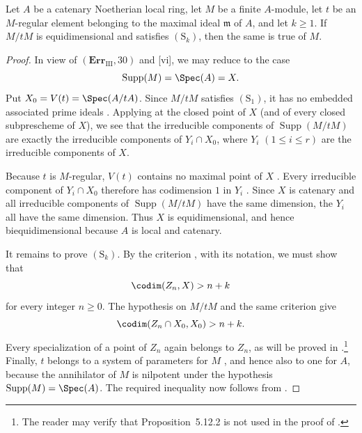 \begin{proposition}[5.12.2]
\label{IV.5.12.2}
Let $A$ be a catenary Noetherian local ring, let $M$ be a finite
$A$-module, let $t$ be an $M$-regular element belonging to the
maximal ideal $\mathfrak m$ of $A$, and let $k\geq1$.  If $M/tM$
is equidimensional and satisfies $(\mathrm S_k)$, then the same is
true of $M$.
\end{proposition}

\begin{proof}
In view of $(\mathbf{Err}_{\mathrm{III}},30)$ and
[vi], we may reduce to the case
\[
  \operatorname{Supp}(M)=\Spec(A)=X.
\]
Put $X_0=V(t)=\Spec(A/tA)$.  Since $M/tM$ satisfies
$(\mathrm S_1)$, it has no embedded associated prime ideals
.  Applying  at the closed point of
$X$ (and of every closed subprescheme of $X$), we see that the
irreducible components of $\operatorname{Supp}(M/tM)$ are exactly
the irreducible components of $Y_i\cap X_0$, where
$Y_i$ $(1\leq i\leq r)$ are the irreducible components of $X$.

Because $t$ is $M$-regular, $V(t)$ contains no maximal point of
$X$ .  Every irreducible component of
$Y_i\cap X_0$ therefore has codimension $1$ in $Y_i$
.  Since $X$ is catenary and all irreducible
components of $\operatorname{Supp}(M/tM)$ have the same
dimension, the $Y_i$ all have the same dimension.  Thus $X$ is
equidimensional, and hence biequidimensional because $A$ is local
and catenary.

It remains to prove $(\mathrm S_k)$.  By the criterion
, with its notation, we must show that
\[
  \codim(Z_n,X)>n+k
\]
for every integer $n\geq0$.  The hypothesis on $M/tM$ and the same
criterion give
\[
  \codim(Z_n\cap X_0,X_0)>n+k.
\]
Every specialization of a point of $Z_n$ again belongs to $Z_n$,
as will be proved in .\footnote{The reader may
verify that Proposition~5.12.2 is not used in the proof of
.}  Finally, $t$ belongs to a system of
parameters for $M$ , and hence also to one for
$A$, because the annihilator of $M$ is nilpotent under the
hypothesis $\operatorname{Supp}(M)=\Spec(A)$.  The required
inequality now follows from .
\end{proof}

